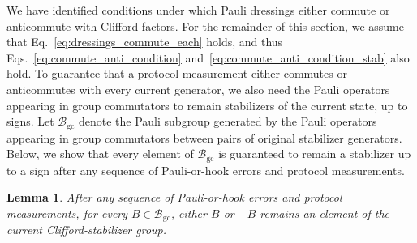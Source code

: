 \documentclass[
 reprint,
 amsmath,amssymb,
 pra,superscriptaddress, nofootinbib
]{revtex4-2}
\newtheorem{lemma}{Lemma}
\theoremstyle{definition}
\theoremstyle{plain}
\begin{document}
We have identified conditions under which Pauli dressings either commute or anticommute with Clifford factors. 
For the remainder of this section, we assume that Eq.~\eqref{eq:dressings_commute_each} holds, and thus Eqs.~\eqref{eq:commute_anti_condition} and~\eqref{eq:commute_anti_condition_stab} also hold.
To guarantee that a protocol measurement either commutes or anticommutes with every current generator, we also need the Pauli operators appearing in group commutators to remain stabilizers of the current state, up to signs.
Let $\mathcal{B}_{\mathrm{gc}}$ denote the Pauli subgroup generated by the Pauli operators appearing in group commutators between pairs of original stabilizer generators.
Below, we show that every element of $\mathcal{B}_{\mathrm{gc}}$ is guaranteed to remain a stabilizer up to a sign after any sequence of Pauli-or-hook errors and protocol measurements.

\begin{lemma}
\label{lem:B_remains_stabilizing}
After any sequence of Pauli-or-hook errors and protocol measurements,
for every $B\in\mathcal{B}_{\mathrm{gc}}$, either $B$ or $-B$ remains
an element of the current Clifford-stabilizer group.
\end{lemma}
\end{document}
